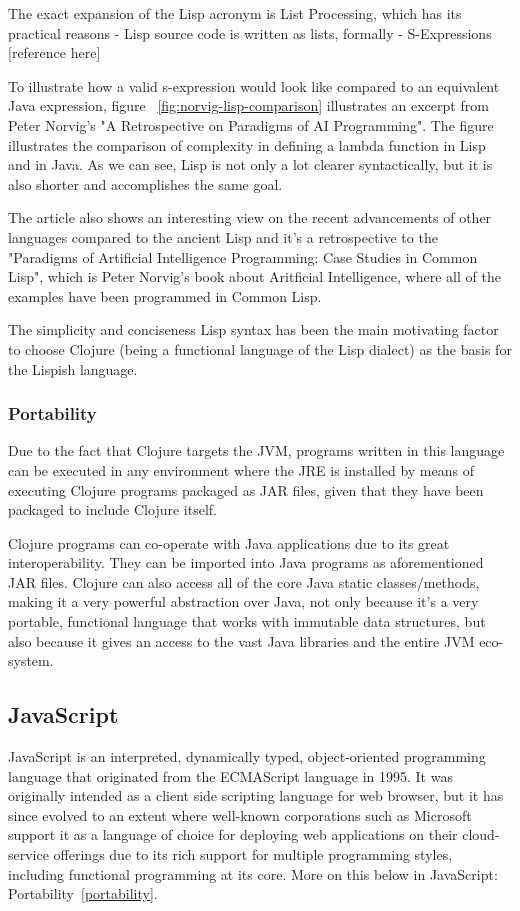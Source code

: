 The exact expansion of the Lisp acronym is List Processing, which has its practical reasons - Lisp source code is written as lists, formally - S-Expressions [reference here]

To illustrate how a valid s-expression would look like compared to an equivalent Java expression, figure ~\ref{fig:norvig-lisp-comparison} illustrates an excerpt from Peter Norvig's "A Retrospective on Paradigms of AI Programming"\cite{retrospective.norvig}. The figure illustrates the comparison of complexity in defining a lambda function in Lisp and in Java. 
As we can see, Lisp is not only a lot clearer syntactically, but it is also shorter and accomplishes the same goal.  



The article also shows an interesting view on the recent advancements of other languages compared to the ancient Lisp and it's a retrospective to the "Paradigms of Artificial Intelligence Programming: Case Studies in Common Lisp"\cite{PAIP.Norvig}, which is Peter Norvig's book about Aritficial Intelligence, where all of the examples have been programmed in Common Lisp.


The simplicity and conciseness Lisp syntax has been the main motivating factor to choose Clojure (being a functional language of the Lisp dialect) as the basis for the Lispish language. 

\subsubsection{Portability}
Due to the fact that Clojure targets the JVM, programs written in this language can be executed in any environment where the JRE is installed by means of executing Clojure programs packaged as JAR files, given that they have been packaged to include Clojure itself.  

Clojure programs can co-operate with Java applications due to its great interoperability. They can be imported into Java programs as aforementioned JAR files.
Clojure can also access all of the core Java static classes/methods, making it a very powerful abstraction over Java, not only because it's a very portable, functional language that works with immutable data structures, but also because it gives an access to the vast Java libraries and the entire JVM eco-system.

\subsection{JavaScript}
JavaScript is an interpreted, dynamically typed, object-oriented programming language that originated from the ECMAScript language in 1995. It was originally intended as a client side scripting language for web browser, but it has since evolved to an extent where well-known corporations such as Microsoft support it as a language of choice for deploying web applications  on their cloud-service offerings due to its rich support for multiple programming styles, including functional programming at its core. More on this below in JavaScript: Portability~\ref{portability}.  


